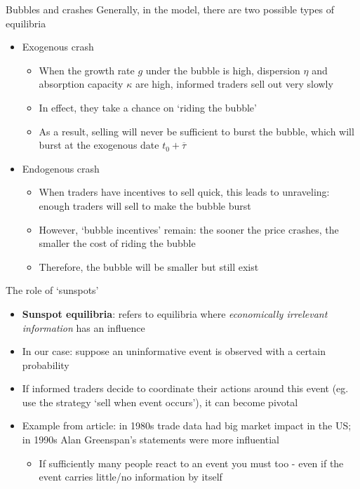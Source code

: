 \documentclass[english,10pt
,aspectratio=169
]{beamer}
\begin{document}
\begin{frame}{Bubbles and crashes}
	Generally, in the model, there are two possible types of equilibria
	\begin{itemize}
		\item Exogenous crash
		\begin{itemize}
			\item When the growth rate $g$ under the bubble is high, dispersion $\eta$ and absorption capacity $\kappa$ are high,  informed traders sell out very slowly
			\item In effect, they take a chance on `riding the bubble'
			\item As a result, selling will never be sufficient to burst the bubble, which will burst at the exogenous date $t_0+\overline{\tau}$
		\end{itemize}
		\item Endogenous crash
		\begin{itemize}
			\item When traders have incentives to sell quick, this leads to unraveling: enough traders will sell to make the bubble burst
			\item However, `bubble incentives' remain: the sooner the price crashes, the smaller the cost of riding the bubble
			\item Therefore, the bubble will be smaller but still exist
		\end{itemize}
	\end{itemize}
\end{frame}


\begin{frame}{The role of `sunspots'}
	\begin{itemize}
		\item \textbf{Sunspot equilibria}: refers to equilibria where \emph{economically irrelevant information} has an influence
		\item In our case: suppose an uninformative event is observed with a certain probability 
		\item If informed traders decide to coordinate their actions around this event (eg. use the strategy `sell when event occurs'), it can become pivotal
		\item Example from article: in 1980s trade data had big market impact in the US; in 1990s Alan Greenspan's statements were more influential
		\begin{itemize}
			\item If sufficiently many people react to an event you must too - even if the event carries little/no information by itself
		\end{itemize}
	\end{itemize}
\end{frame}
\end{document}
